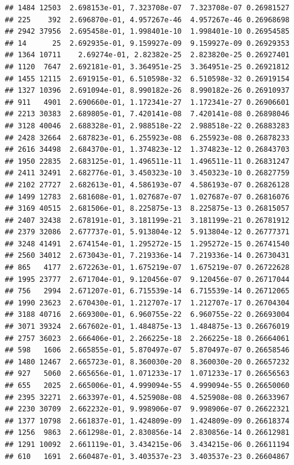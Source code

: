 \documentclass[
]{article}
\begin{document}
\begin{verbatim}
## 1484 12503  2.698153e-01, 7.323708e-07  7.323708e-07 0.26981527
## 225    392  2.696870e-01, 4.957267e-46  4.957267e-46 0.26968698
## 2942 37956  2.695458e-01, 1.998401e-10  1.998401e-10 0.26954585
## 14      25  2.692935e-01, 9.159927e-09  9.159927e-09 0.26929353
## 1364 10711    2.69274e-01, 2.82382e-25  2.823820e-25 0.26927401
## 1120  7647  2.692181e-01, 3.364951e-25  3.364951e-25 0.26921812
## 1455 12115  2.691915e-01, 6.510598e-32  6.510598e-32 0.26919154
## 1327 10396  2.691094e-01, 8.990182e-26  8.990182e-26 0.26910937
## 911   4901  2.690660e-01, 1.172341e-27  1.172341e-27 0.26906601
## 2213 30383  2.689805e-01, 7.420141e-08  7.420141e-08 0.26898046
## 3128 40046  2.688328e-01, 2.988518e-22  2.988518e-22 0.26883283
## 2428 32664  2.687823e-01, 6.255923e-08  6.255923e-08 0.26878233
## 2616 34498  2.684370e-01, 1.374823e-12  1.374823e-12 0.26843703
## 1950 22835  2.683125e-01, 1.496511e-11  1.496511e-11 0.26831247
## 2411 32491  2.682776e-01, 3.450323e-10  3.450323e-10 0.26827759
## 2102 27727  2.682613e-01, 4.586193e-07  4.586193e-07 0.26826128
## 1499 12783  2.681608e-01, 1.027687e-07  1.027687e-07 0.26816076
## 3169 40515  2.681506e-01, 8.225875e-13  8.225875e-13 0.26815057
## 2407 32438  2.678191e-01, 3.181199e-21  3.181199e-21 0.26781912
## 2379 32086  2.677737e-01, 5.913804e-12  5.913804e-12 0.26777371
## 3248 41491  2.674154e-01, 1.295272e-15  1.295272e-15 0.26741540
## 2560 34012  2.673043e-01, 7.219336e-14  7.219336e-14 0.26730431
## 865   4177  2.672263e-01, 1.675219e-07  1.675219e-07 0.26722628
## 1995 23777  2.671704e-01, 9.120456e-07  9.120456e-07 0.26717044
## 756   2994  2.671207e-01, 6.715539e-14  6.715539e-14 0.26712065
## 1990 23623  2.670430e-01, 1.212707e-17  1.212707e-17 0.26704304
## 3188 40716  2.669300e-01, 6.960755e-22  6.960755e-22 0.26693004
## 3071 39324  2.667602e-01, 1.484875e-13  1.484875e-13 0.26676019
## 2757 36023  2.666406e-01, 2.266225e-18  2.266225e-18 0.26664061
## 598   1606  2.665855e-01, 5.870497e-07  5.870497e-07 0.26658546
## 1480 12467  2.665723e-01, 8.360030e-20  8.360030e-20 0.26657232
## 927   5060  2.665656e-01, 1.071233e-17  1.071233e-17 0.26656563
## 655   2025  2.665006e-01, 4.999094e-55  4.999094e-55 0.26650060
## 2395 32271  2.663397e-01, 4.525908e-08  4.525908e-08 0.26633967
## 2230 30709  2.662232e-01, 9.998906e-07  9.998906e-07 0.26622321
## 1377 10798  2.661837e-01, 1.424809e-09  1.424809e-09 0.26618374
## 1256  9863  2.661298e-01, 2.830856e-14  2.830856e-14 0.26612981
## 1291 10092  2.661119e-01, 3.434215e-06  3.434215e-06 0.26611194
## 610   1691  2.660487e-01, 3.403537e-23  3.403537e-23 0.26604867

\end{verbatim}
\end{document}
